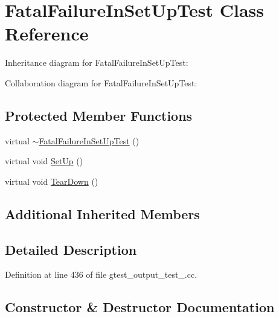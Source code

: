 \hypertarget{class_fatal_failure_in_set_up_test}{}\section{Fatal\+Failure\+In\+Set\+Up\+Test Class Reference}
\label{class_fatal_failure_in_set_up_test}


Inheritance diagram for Fatal\+Failure\+In\+Set\+Up\+Test\+:


Collaboration diagram for Fatal\+Failure\+In\+Set\+Up\+Test\+:
\subsection*{Protected Member Functions}
\begin{DoxyCompactItemize}
\item 
virtual \hyperlink{class_fatal_failure_in_set_up_test_a915ca362b046259c3586c1ab72bb0a93}{$\sim$\+Fatal\+Failure\+In\+Set\+Up\+Test} ()
\item 
virtual void \hyperlink{class_fatal_failure_in_set_up_test_a455696f86fb5f5393624221ccb79b373}{Set\+Up} ()
\item 
virtual void \hyperlink{class_fatal_failure_in_set_up_test_a457707161063e08f7b6600ec5db449e4}{Tear\+Down} ()
\end{DoxyCompactItemize}
\subsection*{Additional Inherited Members}


\subsection{Detailed Description}


Definition at line 436 of file gtest\+\_\+output\+\_\+test\+\_\+.\+cc.



\subsection{Constructor \& Destructor Documentation}
